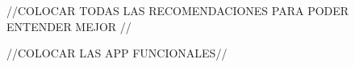 //COLOCAR TODAS LAS RECOMENDACIONES PARA PODER ENTENDER MEJOR //











//COLOCAR LAS APP FUNCIONALES//

